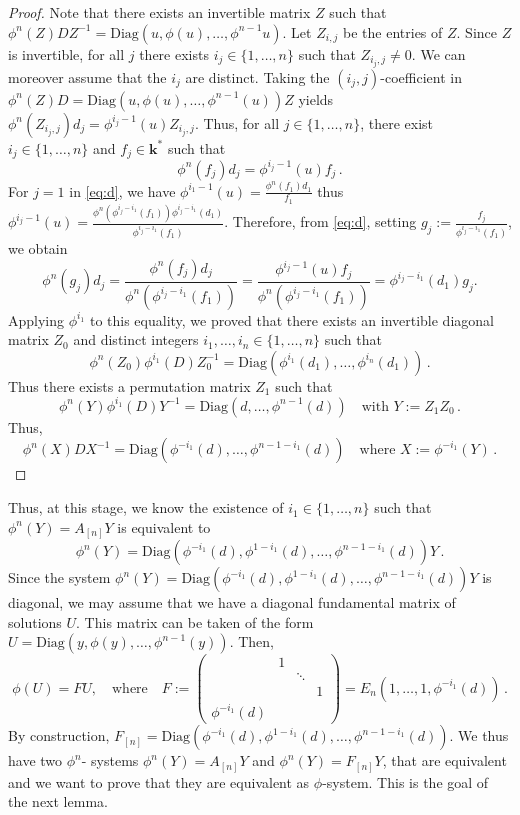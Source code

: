 \documentclass[a4paper,11pt]{amsart}
\def\k{\mathbf{k}}
\begin{document}
\begin{proof}
Note that there exists  an invertible matrix $Z$ such that   $\phi^n (Z)DZ^{-1}=\mathrm{Diag}(u,\phi(u),\dots,  \phi^{n-1} u)$. 
Let $Z_{i,j}$ be the entries of $Z$. Since $Z$ is invertible, for all $j$ there exists $i_j\in\lbrace 1, \ldots,n\rbrace$ such that $Z_{i_j,j}\neq 0$. We can moreover assume that the $i_j$ are distinct. Taking the $(i_j,j)$-coefficient in $\phi^n (Z)D=\mathrm{Diag}(u,\phi(u),\dots,  \phi^{n-1} (u))Z$ yields $\phi^n  (Z_{i_j,j})d_j=\phi^{i_j-1}(u)Z_{i_j,j}$. Thus, for all $j\in\lbrace 1,\ldots, n\rbrace$, there exist $i_j\in\lbrace 1,\ldots, n\rbrace$ and $f_j\in\k^*$ such that 
\begin{equation}
    \label{eq:d}
    \phi^n(f_j)d_j = \phi^{i_j-1}(u)f_j\, .
\end{equation}
 For $j=1$ in \eqref{eq:d}, we have $\phi^{i_1-1}(u) = \frac{\phi^n(f_1)d_1}{f_1}$ thus $\phi^{i_j-1}(u) = \frac{\phi^n(\phi^{i_j-i_1}(f_1))\phi^{i_j-i_1}(d_1)}{\phi^{i_j-i_1}(f_1)}$. Therefore, from \eqref{eq:d}, setting $g_j:= \frac{f_j}{\phi^{i_j-i_1}(f_1)}$,  we obtain
 $$
 \phi^n(g_j)d_j= \frac{\phi^n (f_j)d_j}{\phi^n(\phi^{i_j-i_1}(f_1))}= \frac{ \phi^{i_j-1}(u)f_j}{\phi^n(\phi^{i_j-i_1}(f_1))}=  \phi^{i_j-i_1}(d_1)g_j.
 $$ 
Applying $\phi^{i_1}$ to this equality, we proved that there exists an invertible diagonal matrix $Z_0$ and distinct integers $i_1,\ldots,i_n\in\lbrace 1,\ldots,n\rbrace$ such that 
$$
\phi^n(Z_0)\phi^{i_1}(D)Z_0^{-1} = \mathrm{Diag}(\phi^{i_1}(d_1) ,\dots,  \phi^{i_n}(d_1))\, . 
$$
Thus there exists a permutation matrix $Z_1$ such that 
$$
\phi^n(Y)\phi^{i_1}(D) Y^{-1} = \mathrm{Diag}(d,\ldots,\phi^{n-1}(d))\quad \text{with } Y:=Z_1Z_0\, .
$$
 Thus,
$$
\phi^n(X)D X^{-1} = \mathrm{Diag}(\phi^{-i_1}(d),\ldots,\phi^{n-1-i_1}(d))\quad \text{where }X:=\phi^{-i_1}(Y)\, .
$$
\end{proof}

Thus, at this stage, we know  the existence of $i_1\in\lbrace 1,\ldots,n\rbrace$  such that   $\phi^n (Y)=A_{[n]}Y$ is equivalent to 
$$
\phi^n(Y)=\mathrm{Diag}(\phi^{-i_1}(d),\phi^{1-i_1}(d),\ldots,  \phi^{n-1-i_1}(d))Y\, .
$$
Since the system 
$
\phi^n(Y)=\mathrm{Diag}(\phi^{-i_1}(d),\phi^{1-i_1}(d),\ldots,  \phi^{n-1-i_1}(d))Y
$ is diagonal, we may assume that we have a diagonal fundamental matrix of solutions $U$. This matrix can be taken of the form $U=\mathrm{Diag}(y,\phi(y),\dots,  \phi^{n-1}(y))$. Then, 
$$
\phi(U)=FU, \quad \text{where}\quad F:=\begin{pmatrix}
& 1&&\\ 
 &  &\ddots & \\
&&&1 \\
\phi^{-i_1}(d)&&&
\end{pmatrix}=E_n (1,\dots, 1, \phi^{-i_1}(d))\, .
$$
By construction, 
$F_{[n]} = \mathrm{Diag}(\phi^{-i_1}(d),\phi^{1-i_1}(d),\ldots,\phi^{n-1-i_1}(d))$. We thus have two $\phi^n$- systems $\phi^n(Y) = A_{[n]}Y$ and $\phi^n(Y) = F_{[n]}Y$, that are equivalent and we want to prove that they are equivalent as $\phi$-system. This is the goal of the next lemma. 
\end{document}
